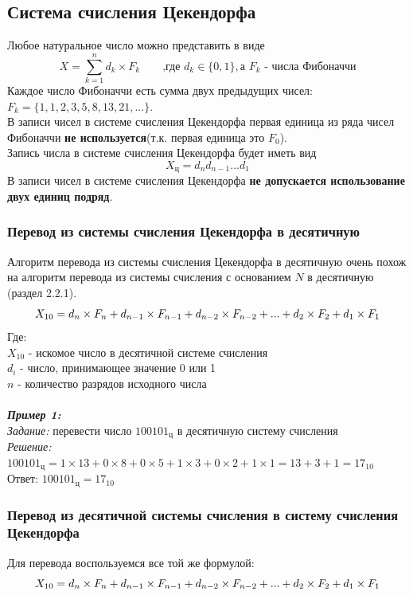 \subsection{Система счисления Цекендорфа}
Любое натуральное число можно представить в виде
$$ X = \sum^{n}_{k = 1} d_{k}\times F_{k} \qquad \mbox{,где  } d_{k} \in \{0,1\},\mbox{а } F_{k} \mbox{ - числа Фибоначчи} $$
Каждое число Фибоначчи есть сумма двух предыдущих чисел:
\\ $F_{k} = \{1, 1, 2, 3, 5, 8, 13, 21, ...\}$.
\\В записи чисел в системе счисления Цекендорфа первая единица из ряда чисел Фибоначчи \textbf{не используется}(т.к. первая единица это $F_{0}$).
\\Запись числа в системе счисления Цекендорфа будет иметь вид $$X_{\mbox{ц}} = d_{n}d_{n-1}...d_{1} $$
В записи чисел в системе счисления Цекендорфа \textbf{не допускается использование двух единиц подряд}.
\subsubsection{Перевод из системы счисления Цекендорфа в десятичную}
Алгоритм перевода из системы счисления Цекендорфа в десятичную очень похож на алгоритм перевода из системы счисления с основанием $N$ в десятичную (раздел 2.2.1).
$$ X_{10} = d_{n}\times F_{n} + d_{n-1}\times F_{n-1} + d_{n-2}\hm\times F_{n-2}\hm + ...\hm + d_{2}\times F_{2} + d_{1}\times F_{1}$$
Где:
\\$X_{10}$ - искомое число в десятичной системе счисления
\\$d_{i}$ - число, принимающее значение 0 или 1
\\$n$ - количество разрядов исходного числа
\\
\\\emph{\textbf{Пример 1:}}
\\\emph{Задание:} перевести число $100101_{\mbox{ц}}$ в десятичную систему счисления
\\\emph{Решение:} $100101_{\mbox{ц}} = 1\times 13 + 0\times 8 + 0\times 5 + 1\times 3 + 0\times 2 + 1\times 1 = 13 + 3 + 1 = 17_{10}$
\\Ответ:  $100101_{\mbox{ц}} = 17_{10}$
\subsubsection{Перевод из десятичной системы счисления в систему счисления Цекендорфа}
Для перевода воспользуемся все той же формулой:
$$ X_{10} = d_{n}\times F_{n} + d_{n-1}\times F_{n-1} + d_{n-2}\hm\times F_{n-2}\hm + ...\hm + d_{2}\times F_{2} + d_{1}\times F_{1}$$

